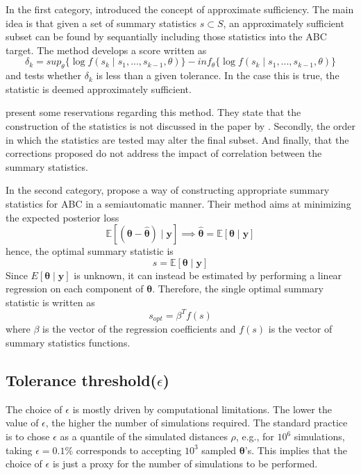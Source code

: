 \documentclass[runningheads]{llncs}
\begin{document}
In the first category, \citet{Joyce2008} introduced the concept
of approximate sufficiency. The main idea is that given a set
of summary statistics $s \subset S$, an approximately sufficient subset can
be found by sequantially including those statistics into the ABC
target. The method develops a score written as
\begin{equation}
\delta_k = sup_\theta \{
\log f(s_k \mid s_1,...,s_{k-1},\theta)
\}
- inf_\theta\{
\log f(s_k \mid s_1,...,s_{k-1},\theta)
\}
\end{equation}
and tests whether $\delta_k$ is less than a given tolerance. In the
case this is true, the statistic is deemed approximately sufficient.

\citet{Marin2012} present some reservations regarding this method.
They state that the construction of the statistics is not
discussed in the paper by \citet{Joyce2008}. Secondly, the
order in which the statistics are tested may alter the final subset.
And finally, that the corrections proposed do not address the impact
of correlation between the summary statistics.

In the second category,
\citet{fearnhead2010constructing} propose a way of constructing
appropriate summary statistics for ABC in a semiautomatic manner.
Their method aims at minimizing the expected posterior loss
\begin{equation}
\mathbb E[(\bm\theta - \bm{\hat\theta})\mid \bm y]
\implies
\bm {\hat\theta} = \mathbb E[\bm\theta \mid \bm y]
\end{equation}
hence, the optimal summary statistic is
\begin{equation}
s = \mathbb E[\bm \theta \mid \bm y]
\end{equation}
Since $E[\bm \theta \mid \bm y]$ is unknown, it can instead
be estimated by performing a linear regression on each
component of $\bm \theta$. Therefore, the single optimal
summary statistic is written as
\begin{equation}
s_{opt} =  \beta^T f(s)
\end{equation}
where $\beta$ is the vector of the regression coefficients and
$f(s)$ is the vector of summary statistics functions.


\subsection{Tolerance threshold($\epsilon$)}
\label{subsec:statistical-summaries}
The choice of $\epsilon$ is mostly driven by computational
limitations. The lower the value of $\epsilon$, the higher
the number of simulations required. The standard practice
\citep{Beaumont2012} is to chose $\epsilon$ as a quantile
of the simulated distances $\rho$, e.g., for $10^6$ simulations,
taking $\epsilon = 0.1\%$ corresponds to accepting
$10^3$ sampled $\bm \theta$'s. This implies that the choice
of $\epsilon$ is just a proxy for the number of simulations
to be performed.
\end{document}
